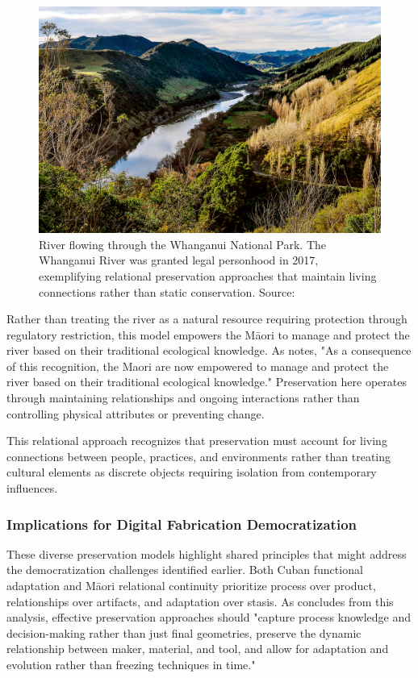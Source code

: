 \begin{figure}[H]
\centering
\includegraphics[width=1\textwidth]{figures/chapter2/whanganui.jpg}
\caption{River flowing through the Whanganui National Park. The Whanganui River was granted legal personhood in 2017, exemplifying relational preservation approaches that maintain living connections rather than static conservation. Source: \citet{paremata2017}}
\label{fig:whanganui_river}
\end{figure}

Rather than treating the river as a natural resource requiring protection through regulatory restriction, this model empowers the Māori to manage and protect the river based on their traditional ecological knowledge. As \citet{vijaykuma2019} notes, "As a consequence of this recognition, the Maori are now empowered to manage and protect the river based on their traditional ecological knowledge." Preservation here operates through maintaining relationships and ongoing interactions rather than controlling physical attributes or preventing change.

\vspace{0.5cm}

This relational approach recognizes that preservation must account for living connections between people, practices, and environments rather than treating cultural elements as discrete objects requiring isolation from contemporary influences.

\subsubsection{Implications for Digital Fabrication Democratization}

These diverse preservation models highlight shared principles that might address the democratization challenges identified earlier. Both Cuban functional adaptation and Māori relational continuity prioritize process over product, relationships over artifacts, and adaptation over stasis. As \citet{munoz_zanon_2025} concludes from this analysis, effective preservation approaches should "capture process knowledge and decision-making rather than just final geometries, preserve the dynamic relationship between maker, material, and tool, and allow for adaptation and evolution rather than freezing techniques in time."


